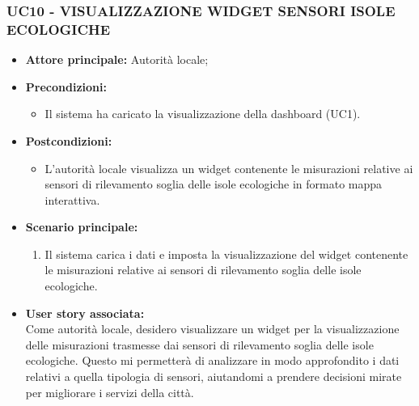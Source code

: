 \subsubsection{UC10 - VISUALIZZAZIONE WIDGET SENSORI ISOLE ECOLOGICHE}
\begin{itemize}
    \item \textbf{Attore principale:} Autorità locale;
    \item \textbf{Precondizioni:}
        \begin{itemize}
            \item Il sistema ha caricato la visualizzazione della dashboard (UC1).
        \end{itemize}
    \item \textbf{Postcondizioni:}
        \begin{itemize}
            \item L'autorità locale visualizza un widget contenente le misurazioni relative ai sensori di rilevamento soglia delle isole ecologiche in formato mappa interattiva.
        \end{itemize}
    \item \textbf{Scenario principale:}
        \begin{enumerate}
            \item Il sistema carica i dati e imposta la visualizzazione del widget contenente le misurazioni relative ai sensori di rilevamento soglia delle isole ecologiche.
        \end{enumerate}
    \item \textbf{User story associata:} \\
        Come autorità locale, desidero visualizzare un widget per la visualizzazione delle misurazioni trasmesse dai sensori di rilevamento soglia delle isole ecologiche. Questo mi permetterà di analizzare in modo approfondito i dati relativi a quella tipologia di sensori, aiutandomi a prendere decisioni mirate per migliorare i servizi della città.
\end{itemize}